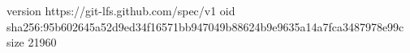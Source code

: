 version https://git-lfs.github.com/spec/v1
oid sha256:95b602645a52d9ed34f16571bb947049b88624b9e9635a14a7fca3487978e99c
size 21960
